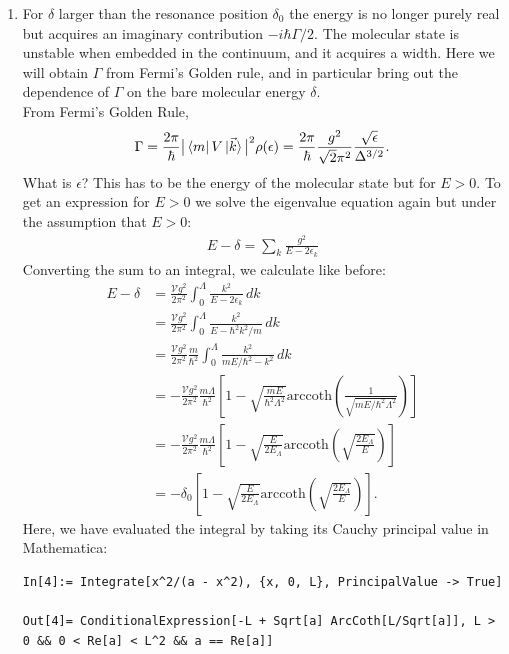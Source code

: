 \documentclass{article}
\theoremstyle{definition}
\newcommand{\f}[2]{\frac{#1}{#2}}
\newcommand{\lp}{\left(}
\newcommand{\rp}{\right)}
\newcommand{\lb}{\left[}
\newcommand{\rb}{\right]}
\begin{document}
\begin{enumerate}[label=(\alph*)]
\item For $\delta$ larger than the resonance position $\delta_0$ the energy  is no longer purely real but acquires an imaginary contribution $-i\hbar \Gamma/2$. The molecular state is unstable when embedded in the
continuum, and it acquires a width. Here we will obtain $\Gamma$ from Fermi’s Golden rule, and in particular
bring out the dependence of $\Gamma$ on the bare molecular energy $\delta$. \\

\noindent From Fermi's Golden Rule, 
\begin{align*}
\Gamma = \f{2\pi}{\hbar}  \big\vert   \bra*{m}  V  \ket*{\vec{k}}  \big\vert^2 \rho(\epsilon) = 
\f{2\pi }{\hbar}  \f{g^2}{\sqrt{2} \pi^2} \f{\sqrt{\epsilon}}{\Delta^{3/2}} .
\end{align*}
What is $\epsilon$? This has to be the energy of the molecular state but for $E>0$. To get an expression for $E>0$ we solve the eigenvalue equation again  but under the assumption that $E>0$:
\begin{align*}
E - \delta = \sum_k \f{g^2}{E - 2\epsilon_k}
\end{align*}
Converting the sum to an integral, we calculate like before:
\begin{align*}
{E} - \delta 
&=  \f{\mathcal{V} g^2 }{2\pi^2} \int_0^\Lambda \f{k^2}{E - 2\epsilon_k } \, dk \\
&=  \f{\mathcal{V} g^2 }{2\pi^2} \int_0^\Lambda \f{k^2}{E - \hbar^2 k^2/m } \, dk  \\
&=  \f{\mathcal{V} g^2 }{2\pi^2} \f{m}{\hbar^2} \int_0^\Lambda  \f{k^2}{m {E} / \hbar^2 - k^2}  \,dk  \\
&=  -\f{\mathcal{V} g^2 }{2\pi^2} \f{m\Lambda}{\hbar^2} \lb 1 - \sqrt{\f{m{E}}{\hbar^2\Lambda^2}} \text{arccoth}\lp \f{1}{\sqrt{m{E} / \hbar^2\Lambda^2}}  \rp \rb \\ 
&= -\f{\mathcal{V} g^2 }{2\pi^2} \f{m\Lambda}{\hbar^2} \lb 1 -  \sqrt{\f{{E}}{2E_\Lambda}} \text{arccoth}\lp 
\sqrt{\f{2E_\Lambda}{{E}}}
\rp \rb\\
&= -\delta_0\lb 1 -  \sqrt{\f{{E}}{2E_\Lambda}} \text{arccoth}\lp 
\sqrt{\f{2E_\Lambda}{{E}}}
\rp \rb.
\end{align*}
Here, we have evaluated the integral by taking its Cauchy principal value in Mathematica:
\begin{lstlisting}
In[4]:= Integrate[x^2/(a - x^2), {x, 0, L}, PrincipalValue -> True]

Out[4]= ConditionalExpression[-L + Sqrt[a] ArcCoth[L/Sqrt[a]], L > 0 && 0 < Re[a] < L^2 && a == Re[a]]
\end{lstlisting}



\end{enumerate}
\end{document}
